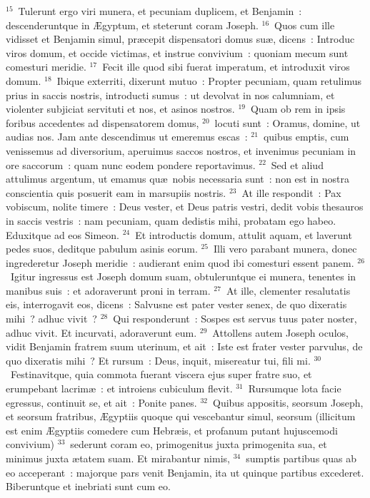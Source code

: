 ${}^{15}$~Tulerunt ergo viri munera, et pecuniam duplicem, et Benjamin~: descenderuntque in \AE gyptum, et steterunt coram Joseph.
${}^{16}$~Quos cum ille vidisset et Benjamin simul, pr\ae cepit dispensatori domus su\ae , dicens~: Introduc viros domum, et occide victimas, et instrue convivium~: quoniam mecum sunt comesturi meridie.
${}^{17}$~Fecit ille quod sibi fuerat imperatum, et introduxit viros domum.
${}^{18}$~Ibique exterriti, dixerunt mutuo~: Propter pecuniam, quam retulimus prius in saccis nostris, introducti sumus~: ut devolvat in nos calumniam, et violenter subjiciat servituti et nos, et asinos nostros.
${}^{19}$~Quam ob rem in ipsis foribus accedentes ad dispensatorem domus,
${}^{20}$~locuti sunt~: Oramus, domine, ut audias nos. Jam ante descendimus ut emeremus escas~:
${}^{21}$~quibus emptis, cum venissemus ad diversorium, aperuimus saccos nostros, et invenimus pecuniam in ore saccorum~: quam nunc eodem pondere reportavimus.
${}^{22}$~Sed et aliud attulimus argentum, ut emamus qu\ae\ nobis necessaria sunt~: non est in nostra conscientia quis posuerit eam in marsupiis nostris.
${}^{23}$~At ille respondit~: Pax vobiscum, nolite timere~: Deus vester, et Deus patris vestri, dedit vobis thesauros in saccis vestris~: nam pecuniam, quam dedistis mihi, probatam ego habeo. Eduxitque ad eos Simeon.
${}^{24}$~Et introductis domum, attulit aquam, et laverunt pedes suos, deditque pabulum asinis eorum.
${}^{25}$~Illi vero parabant munera, donec ingrederetur Joseph meridie~: audierant enim quod ibi comesturi essent panem.
${}^{26}$~Igitur ingressus est Joseph domum suam, obtuleruntque ei munera, tenentes in manibus suis~: et adoraverunt proni in terram.
${}^{27}$~At ille, clementer resalutatis eis, interrogavit eos, dicens~: Salvusne est pater vester senex, de quo dixeratis mihi~? adhuc vivit~?
${}^{28}$~Qui responderunt~: Sospes est servus tuus pater noster, adhuc vivit. Et incurvati, adoraverunt eum.
${}^{29}$~Attollens autem Joseph oculos, vidit Benjamin fratrem suum uterinum, et ait~: Iste est frater vester parvulus, de quo dixeratis mihi~? Et rursum~: Deus, inquit, misereatur tui, fili mi.
${}^{30}$~Festinavitque, quia commota fuerant viscera ejus super fratre suo, et erumpebant lacrim\ae~: et introiens cubiculum flevit.
${}^{31}$~Rursumque lota facie egressus, continuit se, et ait~: Ponite panes.
${}^{32}$~Quibus appositis, seorsum Joseph, et seorsum fratribus, \AE gyptiis quoque qui vescebantur simul, seorsum (illicitum est enim \AE gyptiis comedere cum Hebr\ae is, et profanum putant hujuscemodi convivium)
${}^{33}$~sederunt coram eo, primogenitus juxta primogenita sua, et minimus juxta \ae tatem suam. Et mirabantur nimis,
${}^{34}$~sumptis partibus quas ab eo acceperant~: majorque pars venit Benjamin, ita ut quinque partibus excederet. Biberuntque et inebriati sunt cum eo.

